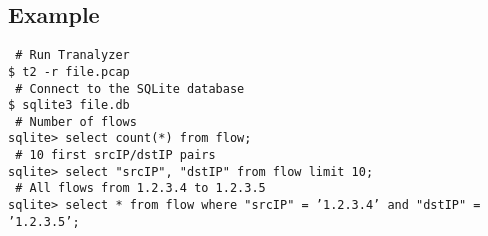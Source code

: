 \documentclass[documentation]{subfiles}
\begin{document}
\subsection{Example}
{\tt\color{blue} \# Run Tranalyzer}\\
{\tt \$ t2 -r file.pcap}\\
{\tt\color{blue} \# Connect to the SQLite database}\\
{\tt \$ sqlite3 file.db}\\
{\tt\color{blue} \# Number of flows}\\
{\tt sqlite> select count(*) from flow;}\\
{\tt\color{blue} \# 10 first srcIP/dstIP pairs}\\
{\tt sqlite> select "srcIP", "dstIP" from flow limit 10;}\\
{\tt\color{blue} \# All flows from 1.2.3.4 to 1.2.3.5}\\
{\tt sqlite> select * from flow where "srcIP" = '1.2.3.4' and "dstIP" = '1.2.3.5';}\\
\end{document}
